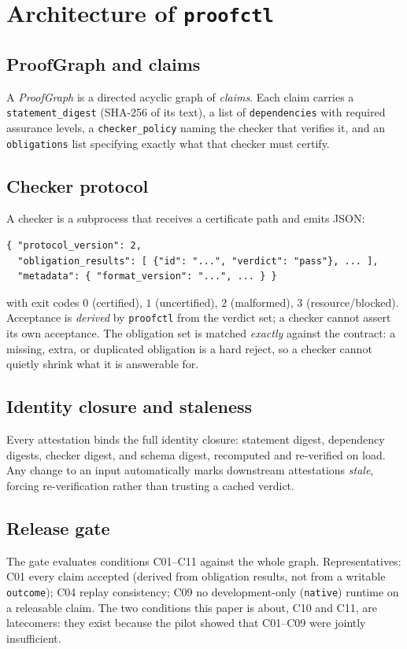 \documentclass[11pt,a4paper]{amsart}
\theoremstyle{plain}
\theoremstyle{definition}
\newcommand{\proofctl}{\texttt{proofctl}}
\newcommand{\CtenA}{\textsf{C10}}
\newcommand{\CelevenA}{\textsf{C11}}
\begin{document}
\section{Architecture of \texorpdfstring{\protect\proofctl}{proofctl}}
\label{sec:arch}

\subsection{ProofGraph and claims}
A \emph{ProofGraph} is a directed acyclic graph of \emph{claims}. Each claim
carries a \texttt{statement\_digest} (SHA-256 of its text), a list of
\texttt{dependencies} with required assurance levels, a \texttt{checker\_policy}
naming the checker that verifies it, and an \texttt{obligations} list specifying
exactly what that checker must certify.

\subsection{Checker protocol}
A checker is a subprocess that receives a certificate path and emits JSON:
\begin{verbatim}
{ "protocol_version": 2,
  "obligation_results": [ {"id": "...", "verdict": "pass"}, ... ],
  "metadata": { "format_version": "...", ... } }
\end{verbatim}
with exit codes $0$ (certified), $1$ (uncertified), $2$ (malformed),
$3$ (resource/blocked). Acceptance is \emph{derived} by \proofctl{} from the
verdict set; a checker cannot assert its own acceptance. The obligation set is
matched \emph{exactly} against the contract: a missing, extra, or duplicated
obligation is a hard reject, so a checker cannot quietly shrink what it is
answerable for.

\subsection{Identity closure and staleness}
Every attestation binds the full identity closure: statement digest, dependency
digests, checker digest, and schema digest, recomputed and re-verified on load.
Any change to an input automatically marks downstream attestations
\emph{stale}, forcing re-verification rather than trusting a cached verdict.

\subsection{Release gate}
The gate evaluates conditions \textsf{C01}--\textsf{C11} against the whole graph.
Representatives: \textsf{C01} every claim accepted (derived from obligation
results, not from a writable \texttt{outcome}); \textsf{C04} replay consistency;
\textsf{C09} no development-only (\texttt{native}) runtime on a releasable claim.
The two conditions this paper is about, \CtenA{} and \CelevenA{}, are
latecomers: they exist because the pilot showed that \textsf{C01}--\textsf{C09}
were jointly insufficient.
\end{document}
